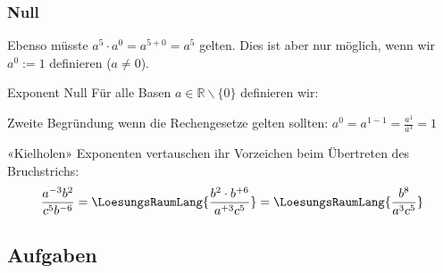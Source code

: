 \newpage



\subsubsection{Null}

Ebenso müsste $a^5 \cdot a^0 = a^{5+0} = a^5$ gelten. Dies ist aber
nur möglich, wenn wir $a^0 := 1$ definieren ($a\ne 0$).

\begin{definition}{Exponent Null}{} Für alle Basen
$a \in \mathbb{R}\backslash\{0\}$ definieren wir:
\begin{center}
\end{center}
\end{definition}

Zweite Begründung wenn die Rechengesetze gelten sollten: $a^0 = a^{1-1} = \frac{a^1}{a^1} = 1$


 




\begin{rezept*}{«Kielholen»}{}{}
Exponenten vertauschen ihr Vorzeichen beim Übertreten des Bruchstrichs:
$$\frac{a^{-3}b^2}{c^5b^{-6}} = \LoesungsRaumLang{\frac{b^2\cdot{}b^{+6}}{a^{+3}c^5}}= \LoesungsRaumLang{\frac{b^8}{a^3c^5}}$$
\end{rezept*}



\subsection{Aufgaben}



